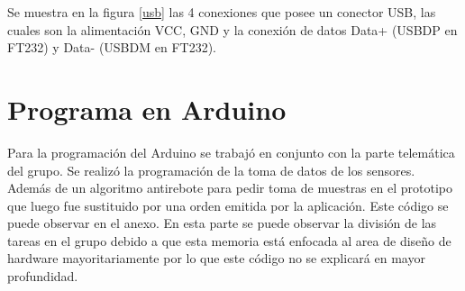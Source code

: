 Se muestra en la figura \ref{usb} las 4 conexiones que posee un conector USB, las cuales son la alimentación VCC, GND y la conexión de datos Data+ (USBDP en FT232) y Data- (USBDM en FT232). 

\newpage
\section{Programa en Arduino}

Para la programación del Arduino se trabajó en conjunto con la parte telemática del grupo. Se realizó la programación de la toma de datos de los sensores. Además de un algoritmo antirebote para pedir toma de muestras en el prototipo que luego fue sustituido por una orden emitida por la aplicación. Este código se puede observar en el anexo. En esta parte se puede observar la división de las tareas en el grupo debido a que esta memoria está enfocada al area de diseño de hardware mayoritariamente por lo que este código no se explicará en mayor profundidad.